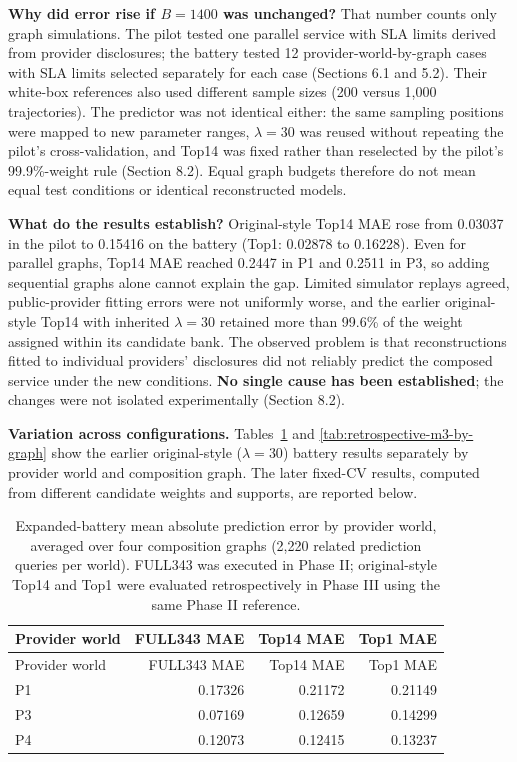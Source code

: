 \documentclass[10pt,a4paper]{article}
\begin{document}
\textbf{Why did error rise if $B=1400$ was unchanged?} That number counts only graph simulations. The pilot tested one parallel service with SLA limits derived from provider disclosures; the battery tested 12 provider-world-by-graph cases with SLA limits selected separately for each case (Sections 6.1 and 5.2). Their white-box references also used different sample sizes (200 versus 1,000 trajectories). The predictor was not identical either: the same sampling positions were mapped to new parameter ranges, $\lambda=30$ was reused without repeating the pilot's cross-validation, and Top14 was fixed rather than reselected by the pilot's 99.9\%-weight rule (Section 8.2). Equal graph budgets therefore do not mean equal test conditions or identical reconstructed models.

\textbf{What do the results establish?} Original-style Top14 MAE rose from 0.03037 in the pilot to 0.15416 on the battery (Top1: 0.02878 to 0.16228). Even for parallel graphs, Top14 MAE reached 0.2447 in P1 and 0.2511 in P3, so adding sequential graphs alone cannot explain the gap. Limited simulator replays agreed, public-provider fitting errors were not uniformly worse, and the earlier original-style Top14 with inherited $\lambda=30$ retained more than 99.6\% of the weight assigned within its candidate bank. The observed problem is that reconstructions fitted to individual providers' disclosures did not reliably predict the composed service under the new conditions. \textbf{No single cause has been established}; the changes were not isolated experimentally (Section 8.2).

\textbf{Variation across configurations.} Tables~\ref{tab:retrospective-m3-by-world} and \ref{tab:retrospective-m3-by-graph} show the earlier original-style ($\lambda=30$) battery results separately by provider world and composition graph. The later fixed-CV results, computed from different candidate weights and supports, are reported below.

\begingroup\footnotesize\setlength{\tabcolsep}{3pt}
\begin{longtable}{@{}p{}rrr@{}}
\caption{Expanded-battery mean absolute prediction error by provider world, averaged over four composition graphs (2,220 related prediction queries per world). FULL343 was executed in Phase II; original-style Top14 and Top1 were evaluated retrospectively in Phase III using the same Phase II reference.}\label{tab:retrospective-m3-by-world}\\
\toprule
Provider world & FULL343 MAE & Top14 MAE & Top1 MAE \\
\midrule\endfirsthead
\toprule
Provider world & FULL343 MAE & Top14 MAE & Top1 MAE \\
\midrule\endhead
P1 & 0.17326 & 0.21172 & 0.21149 \\
P3 & 0.07169 & 0.12659 & 0.14299 \\
P4 & 0.12073 & 0.12415 & 0.13237 \\
\bottomrule
\end{longtable}\endgroup
\end{document}
